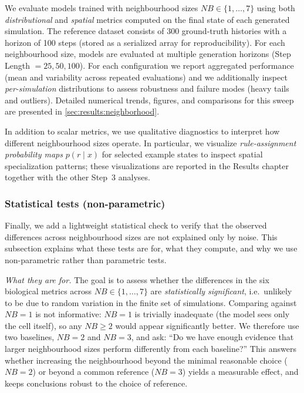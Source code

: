 We evaluate models trained with neighbourhood sizes \(NB \in \{1,\dots,7\}\) using both \emph{distributional} and \emph{spatial} metrics computed on the final state of each generated simulation.
The reference dataset consists of 300 ground-truth histories with a horizon of 100 steps (stored as a serialized array for reproducibility).
For each neighbourhood size, models are evaluated at multiple generation horizons (Step Length \(=25,50,100\)).
For each configuration we report aggregated performance (mean and variability across repeated evaluations) and we additionally inspect \emph{per-simulation} distributions to assess robustness and failure modes (heavy tails and outliers).
Detailed numerical trends, figures, and comparisons for this sweep are presented in \cref{sec:results:neighborhood}.

In addition to scalar metrics, we use qualitative diagnostics to interpret how different neighbourhood sizes operate.
In particular, we visualize \emph{rule-assignment probability maps} \(p(r \mid x)\) for selected example states to inspect spatial specialization patterns; these visualizations are reported in the Results chapter together with the other Step~3 analyses.

\subsubsection{Statistical tests (non-parametric)}
\label{sec:impl:step3:stats}

Finally, we add a lightweight statistical check to verify that the observed differences across neighbourhood sizes are not explained only by noise.
This subsection explains what these tests are for, what they compute, and why we use non-parametric rather than parametric tests.

\textit{What they are for.}
The goal is to assess whether the differences in the six biological metrics across \(NB\in\{1,\dots,7\}\) are \emph{statistically significant}, i.e.\ unlikely to be due to random variation in the finite set of simulations.
Comparing against \(NB=1\) is not informative: \(NB=1\) is trivially inadequate (the model sees only the cell itself), so any \(NB\ge2\) would appear significantly better.
We therefore use two baselines, \(NB=2\) and \(NB=3\), and ask: ``Do we have enough evidence that larger neighbourhood sizes perform differently from each baseline?'' This answers whether increasing the neighbourhood beyond the minimal reasonable choice (\(NB=2\)) or beyond a common reference (\(NB=3\)) yields a measurable effect, and keeps conclusions robust to the choice of reference.

